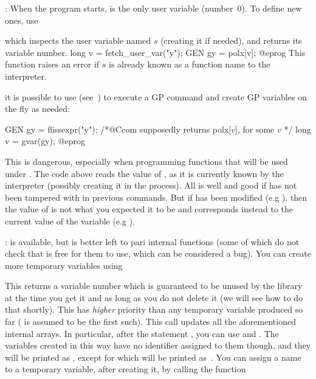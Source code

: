 : When the program starts,
 is the only user variable (number~$0$). To define new ones, use


\noindent which inspects the user variable named $s$ (creating it if needed),
and returns its variable number. 
\bprog
long v = fetch_user_var("y");
GEN gy = polx[v];
@eprog
This function raises an error if $s$ is already known as a function name to
the interpreter.

 it is possible to use 
(see~) to execute a GP command and create GP variables
on the fly as needed:

\bprog
GEN gy = flissexpr("y"); /*@Ccom supposedly returns polx[$v$], for some $v$ */
long v = gvar(gy);
@eprog

\noindent This is dangerous, especially when programming functions that
will be used under . The code above reads the value of , as it is
currently known by the  interpreter (possibly creating it in the
process). All is well and good if  has not been tampered with in
previous  commands. But if  has been modified (e.g ),
then the value of  is not what you expected it to be and corresponds
instead to the current value of the  variable (e.g ).

: 
 is available, but is better left to pari internal functions
(some of which do not check that  is free for them to use,
which can be considered a bug). You can create more temporary variables
using

\label{se:fetch_var}

\noindent
This returns a variable number which is guaranteed to be unused by the
library at the time you get it and as long as you do not delete it (we will see
how to do that shortly). This has \emph{higher}
priority than any temporary variable produced so far ( is
assumed to be the first such). This call updates all the aforementioned
internal arrays. In particular, after the statement ,
you can use  and . The variables created in this
way have no identifier assigned to them though, and they will be printed as
, except for  which will be printed
as~\kbd{\#}. You can assign a name to a temporary variable, after creating
it, by calling the function

